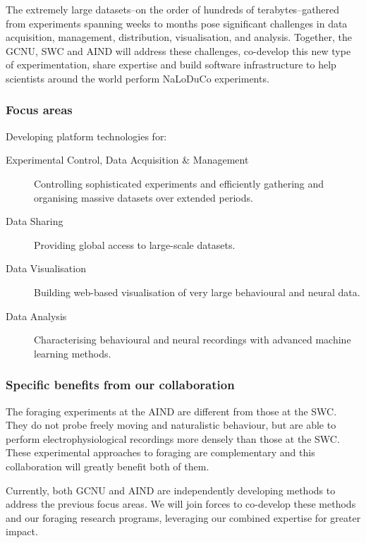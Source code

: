 The extremely large datasets--on the order of hundreds of terabytes--gathered
from experiments spanning weeks to months pose significant challenges in data
acquisition, management, distribution, visualisation, and analysis.
%
Together, the GCNU, SWC and AIND will address these challenges, co-develop this
new type of experimentation, share expertise and build software infrastructure
to help scientists around the world perform NaLoDuCo experiments.

\subsubsection{Focus areas}

Developing platform technologies for:

\begin{description}

    \item[Experimental Control, Data Acquisition \& Management] Controlling
        sophisticated experiments and efficiently gathering and organising
        massive datasets over extended periods.

    \item[Data Sharing] Providing global access to large-scale datasets.

    \item[Data Visualisation] Building web-based visualisation of very large
        behavioural and neural data.

    \item[Data Analysis] Characterising behavioural and neural recordings with
        advanced machine learning methods.

\end{description}

\subsubsection{Specific benefits from our collaboration}

The foraging experiments at the AIND are different from those at the SWC. They
do not probe freely moving and naturalistic behaviour, but are able to perform
electrophysiological recordings more densely than those at the SWC.
%
These experimental approaches to foraging are complementary and this
collaboration will greatly benefit both of them.

Currently, both GCNU and AIND are independently developing methods to address
the previous focus areas. We will join forces to co-develop these methods and
our foraging research programs, leveraging our combined expertise for greater
impact.

